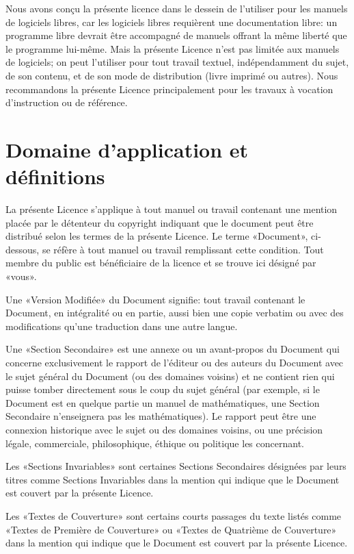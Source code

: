 Nous avons conçu la présente licence dans le dessein de
l'utiliser pour les manuels de logiciels libres, car les logiciels
libres requièrent une documentation libre: un programme libre devrait
être accompagné de manuels offrant la même liberté que le programme
lui-même. Mais la présente Licence n'est pas limitée aux manuels de
logiciels; on peut l'utiliser pour tout travail textuel, indépendamment
du sujet, de son contenu, et de son mode de distribution (livre imprimé
ou autres). Nous recommandons la présente Licence principalement pour
les travaux à vocation d'instruction ou de référence. 


\section{Domaine d'application et définitions} 

La présente Licence s'applique à tout manuel ou travail
contenant une mention placée par le détenteur du copyright indiquant
que le document peut être distribué selon les termes de la présente
Licence. Le terme «Document», ci-dessous, se réfère à tout manuel
ou travail remplissant cette condition. Tout membre du public est
bénéficiaire de la licence et se trouve ici désigné par «vous». 

Une «Version Modifiée» du Document signifie: tout travail
contenant le Document, en intégralité ou en partie, aussi bien une
copie verbatim ou avec des modifications qu'une traduction dans une
autre langue. 

Une «Section Secondaire» est une annexe ou un avant-propos
du Document qui concerne exclusivement le rapport de l'éditeur ou
des auteurs du Document avec le sujet général du Document (ou des
domaines voisins) et ne contient rien qui puisse tomber directement
sous le coup du sujet général (par exemple, si le Document est en
quelque partie un manuel de mathématiques, une Section Secondaire
n'enseignera pas les mathématiques). Le rapport peut être une connexion
historique avec le sujet ou des domaines voisins, ou une précision
légale, commerciale, philosophique, éthique ou politique les concernant. 

Les «Sections Invariables» sont certaines Sections Secondaires
désignées par leurs titres comme Sections Invariables dans la mention
qui indique que le Document est couvert par la présente Licence. 

Les «Textes de Couverture» sont certains courts passages
du texte listés comme «Textes de Première de Couverture» ou «Textes
de Quatrième de Couverture» dans la mention qui indique que le Document
est couvert par la présente Licence. 

